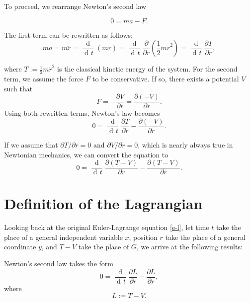 \documentclass[prb,preprint]{revtex4-1}
\DeclareMathOperator{\dd}{d\!}
\DeclareMathOperator{\ddd}{\mathrm{d}}
\begin{document}
To proceed, we rearrange Newton's second law

\begin{equation}
0 = ma - F.
\end{equation}

The first term can be rewritten as follows:
\begin{equation}
ma = m \ddot{r} = \frac{\ddd}{\dd t} (m \dot{r})
= \frac{\ddd}{\dd t} \frac{\partial}{\partial \dot{r}} \left(\frac{1}{2} m \dot{r}^2 \right)
= \frac{\ddd}{\dd t} \frac{\partial T}{\partial \dot{r}},
\end{equation}

where $T:=\frac{1}{2} m \dot{r}^2$ is the classical kinetic energy of the system. For the second term, we assume the force $F$ to be conservative. If so, there exists a potential $V$ such that
\begin{equation}
F = - \frac{\partial V}{\partial r} = \frac{\partial (-V)}{\partial r}.
\end{equation}
Using both rewritten terms, Newton's law becomes
\begin{equation}
0 = \frac{\ddd}{\dd t} \frac{\partial T}{\partial \dot{r}} - \frac{\partial (-V)}{\partial r}.
\end{equation}

If we assume that $\partial T/ \partial r = 0$ and $\partial V / \partial \dot{r} = 0$, which is nearly always true in Newtonian mechanics, we can convert the equation to
\begin{equation}
0 = \frac{\ddd}{\dd t} \frac{\partial (T-V)}{\partial \dot{r}} - \frac{\partial (T-V)}{\partial r}.
\end{equation}

\section{Definition of the Lagrangian} %

Looking back at the original Euler-Lagrange equation \eqref{e-l}, let time $t$ take the place of a general independent variable $x$, position $r$ take the place of a general coordinate $y$, and $T-V$ take the place of $G$, we arrive at the following results:

Newton's second law takes the form
\begin{equation}
0 = \frac{\ddd}{\dd t} \frac{\partial L}{\partial \dot{r}} - \frac{\partial L}{\partial r},
\end{equation}
where
\begin{equation}
 L := T-V.
\end{equation}
\end{document}
